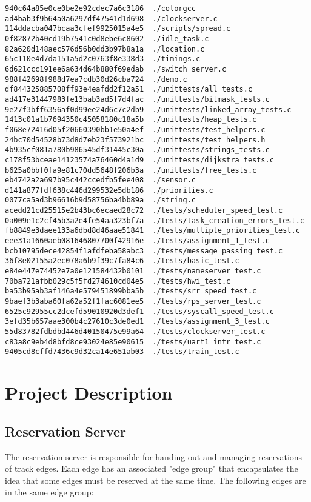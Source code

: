 \documentclass[letterpaper]{article}
\begin{document}
\begin{verbatim}
940c64a85e0ce0be2e92cdec7a6c3186  ./colorgcc
ad4bab3f9b64a0a6297df47541d1d698  ./clockserver.c
114ddacba047bcaa3cfef9925015a4e5  ./scripts/spread.c
0f82872b40cd19b7541c0d8ebe6c8602  ./idle_task.c
82a620d148aec576d56b0dd3b97b8a1a  ./location.c
65c110e4d7da151a5d2c0763f8e338d3  ./timings.c
6d621ccc191ee6a634d64b880f69edab  ./switch_server.c
988f42698f988d7ea7cdb30d26cba724  ./demo.c
df844325885708ff93e4eafdd2f12a51  ./unittests/all_tests.c
ad417e31447983fe13bab3ad5f7d4fac  ./unittests/bitmask_tests.c
9e27f3bff6356af0d99ee24d6c7c2db9  ./unittests/linked_array_tests.c
1413c01a1b7694350c45058180c18a5b  ./unittests/heap_tests.c
f068e72416d05f20660390bb1e50a4ef  ./unittests/test_helpers.c
24bc70d54528b73d8d7eb23f573921bc  ./unittests/test_helpers.h
4b935cf081a780b986545df31445c30a  ./unittests/strings_tests.c
c178f53bceae14123574a76460d4a1d9  ./unittests/dijkstra_tests.c
b625a0bbf0fa9e81c70dd5648f206b3a  ./unittests/free_tests.c
eb4742a2a697b95c442ccedfb5fee408  ./sensor.c
d141a877fdf638c446d299532e5db186  ./priorities.c
0077ca5ad3b96616b9d58756ba4bb89a  ./string.c
acedd21cd25515e2b43bc6ecaed28c72  ./tests/scheduler_speed_test.c
0a009e1c2cf45b3a2e4fe54aa323bf7a  ./tests/task_creation_errors_test.c
fb8849e3daee133a6dbd8d46aae51841  ./tests/multiple_priorities_test.c
eee31a1660aeb081646807700f42916e  ./tests/assignment_1_test.c
bcb10795dece42854f1afdfeba58abc3  ./tests/message_passing_test.c
36f8e02155a2ec078a6b9f39c7fa84c6  ./tests/basic_test.c
e84e447e74452e7a0e121584432b0101  ./tests/nameserver_test.c
70ba721afbb029c5f5fd274610cd04e5  ./tests/hwi_test.c
ba53b95ab3af146a4e579451899bba5b  ./tests/srr_speed_test.c
9baef3b3aba60fa62a52f1fac6081ee5  ./tests/rps_server_test.c
6525c92955cc2dcefd59010920d3def1  ./tests/syscall_speed_test.c
3efd35b657aae300b4c27610c3de0ed1  ./tests/assignment_3_test.c
55d83782fdbdbd446d40150475e99a64  ./tests/clockserver_test.c
c83a8c9eb4d8bfd8ce93024e85e90615  ./tests/uart1_intr_test.c
9405cd8cffd7436c9d32ca14e651ab03  ./tests/train_test.c
\end{verbatim}

\section{Project Description}

\subsection{Reservation Server}

The reservation server is responsible for handing out and managing reservations of track edges. Each edge has an associated "edge group" that encapsulates the idea that some edges must be reserved at the same time. The following edges are in the same edge group:
\end{document}
